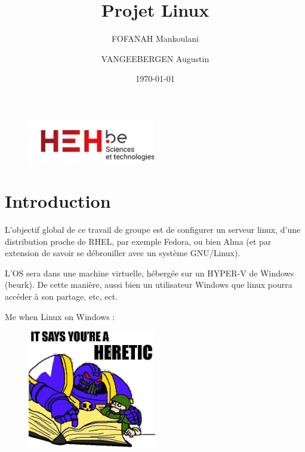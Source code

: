 \documentclass{article}
\title{Projet Linux}
\author{FOFANAH Mankoulani \and VANGEEBERGEN Augustin}
\date{\today}
\begin{document}
	
	\maketitle
	
	\begin{figure}[h]
		\centering
		\includegraphics[width=0.5\textwidth]{logo.png}

		\label{fig:logoheh}
	\end{figure}
	
	\newpage


	\tableofcontents
	\newpage
	
	\section{Introduction}
	
	L'objectif global de ce travail de groupe est de configurer un serveur linux, d'une distribution proche de RHEL, par exemple Fedora, ou bien Alma (et par extension de savoir se débrouiller avec un système GNU/Linux). 
	
	L'OS sera dans une machine virtuelle, hébergée sur un HYPER-V de Windows (beurk). De cette manière, aussi bien un utilisateur Windows que linux pourra accéder à  son partage, etc, ect.
	
	\begin{center}Me when Linux on Windows :
	\end{center}
	\begin{figure}[h]
		\centering
		\includegraphics[width=0.5\textwidth]{meme.png}
		
		\label{fig:your_label}
	\end{figure}
	\newpage
	
\end{document}

